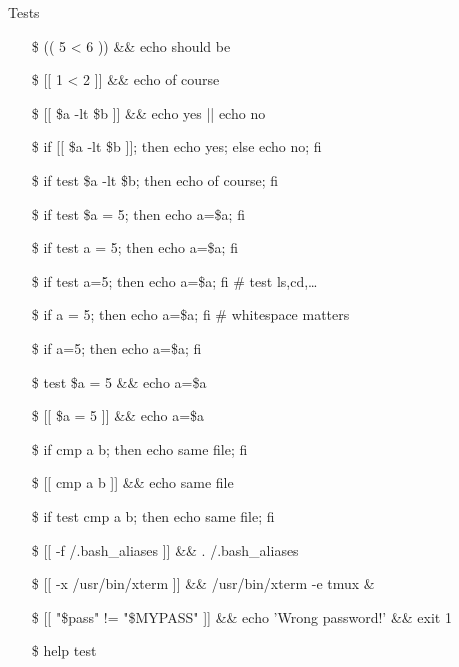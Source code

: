 \begin{frame}[allowframebreaks]{Tests}\small\ttfamily
  \begin{itemize}
  \item[\$] (( 5 < 6 )) \&\& echo should be
  \item[\$] [[ 1 < 2 ]] \&\& echo of course
  \item[\$] [[ \$a -lt \$b ]] \&\& echo yes || echo no
  \item[\$] if [[ \$a -lt \$b ]]; then echo yes; else echo no; fi
  \item[\$] if test \$a -lt \$b; then echo of course; fi
  \item[\$] if test \$a = 5; then echo a=\$a; fi \correct
  \item[\$] if test a = 5; then echo a=\$a; fi \wrong
  \item[\$] if test a=5; then echo a=\$a; fi \Bad{} \# test ls,cd,\ldots
  \item[\$] if a = 5; then echo a=\$a; fi \wrong{} \# whitespace matters
  \item[\$] if a=5; then echo a=\$a; fi \Okay
  \item[\$] test \$a = 5 \&\& echo a=\$a \correct
  \item[\$] [[ \$a = 5 ]] \&\& echo a=\$a \correct
  \item[\$] if cmp a b; then echo same file; fi \correct
  \item[\$] [[ cmp a b ]] \&\& echo same file \wrong
  \item[\$] if test cmp a b; then echo same file; fi \wrong
  \item[\$] [[ -f \symbol{`~}/.bash\_aliases ]] \&\& . /.bash\_aliases
  \item[\$] [[ -x /usr/bin/xterm ]] \&\& /usr/bin/xterm -e tmux \&
  \item[\$] [[ "\$pass" != "\$MYPASS" ]] \&\& echo 'Wrong password!' \&\& exit 1
  \item[\$] help test
  \end{itemize}
  \begin{iblock}{}
    \begin{center}
    \end{center}
  \end{iblock}
\end{frame}

